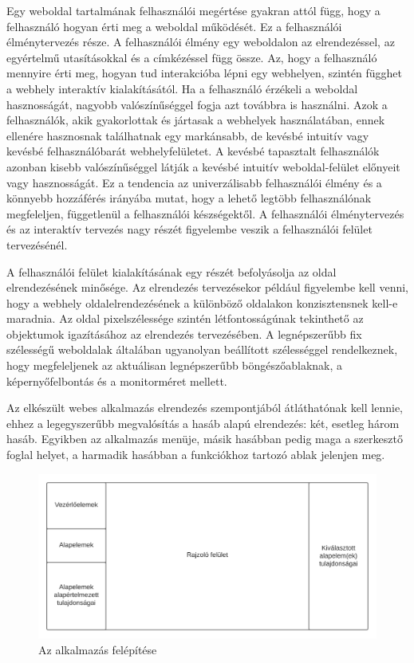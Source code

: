 
Egy weboldal tartalmának felhasználói megértése gyakran attól függ, hogy a felhasználó hogyan érti meg a weboldal működését. Ez a felhasználói élménytervezés része. A felhasználói élmény  egy weboldalon az elrendezéssel, az egyértelmű utasításokkal és a címkézéssel függ össze. Az, hogy a felhasználó mennyire érti meg, hogyan tud interakcióba lépni egy webhelyen, szintén függhet a webhely interaktív kialakításától. Ha a felhasználó érzékeli a weboldal hasznosságát, nagyobb valószínűséggel fogja azt továbbra is használni. Azok a felhasználók, akik gyakorlottak és jártasak a webhelyek használatában, ennek ellenére hasznosnak találhatnak egy markánsabb, de kevésbé intuitív vagy kevésbé felhasználóbarát webhelyfelületet. A kevésbé tapasztalt felhasználók azonban kisebb valószínűséggel látják a kevésbé intuitív weboldal-felület előnyeit vagy hasznosságát. Ez a tendencia az univerzálisabb felhasználói élmény és a könnyebb hozzáférés irányába mutat, hogy a lehető legtöbb felhasználónak megfeleljen, függetlenül a felhasználói készségektől. A felhasználói élménytervezés és az interaktív tervezés nagy részét figyelembe veszik a felhasználói felület tervezésénél.


A felhasználói felület kialakításának egy részét befolyásolja az oldal elrendezésének minősége. Az elrendezés tervezésekor például figyelembe kell venni, hogy a webhely oldalelrendezésének a különböző oldalakon konzisztensnek kell-e maradnia. Az oldal pixelszélessége szintén létfontosságúnak tekinthető az objektumok igazításához az elrendezés tervezésében. A legnépszerűbb fix szélességű weboldalak általában ugyanolyan beállított szélességgel rendelkeznek, hogy megfeleljenek az aktuálisan legnépszerűbb böngészőablaknak, a képernyőfelbontás és a monitorméret mellett.

Az elkészült webes alkalmazás elrendezés szempontjából átláthatónak kell lennie, ehhez a legegyszerűbb megvalósítás a hasáb alapú elrendezés: két, esetleg három hasáb. Egyikben az alkalmazás menüje, másik hasábban pedig maga a szerkesztő foglal helyet, a harmadik hasábban a funkciókhoz tartozó ablak jelenjen meg. 

\begin{figure}[!h]
	\label{fig:block}
	\includegraphics[width=\textwidth]{images/block.png}
	\caption{Az alkalmazás felépítése}
\end{figure}

